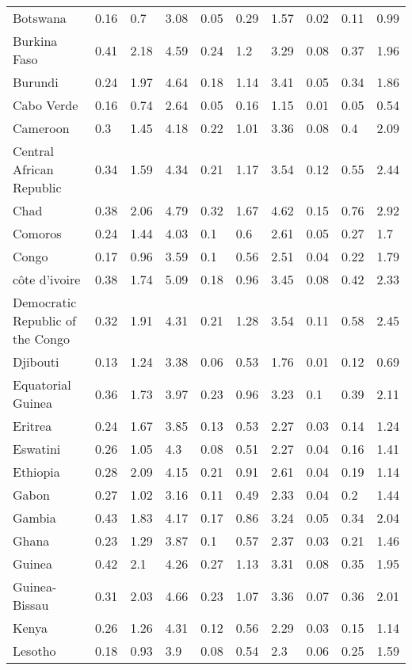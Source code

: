 \begin{longtable}[t]{llllllllll}
Botswana & 0.16 & 0.7 & 3.08 & 0.05 & 0.29 & 1.57 & 0.02 & 0.11 & 0.99\\
Burkina Faso & 0.41 & 2.18 & 4.59 & 0.24 & 1.2 & 3.29 & 0.08 & 0.37 & 1.96\\
Burundi & 0.24 & 1.97 & 4.64 & 0.18 & 1.14 & 3.41 & 0.05 & 0.34 & 1.86\\
Cabo Verde & 0.16 & 0.74 & 2.64 & 0.05 & 0.16 & 1.15 & 0.01 & 0.05 & 0.54\\
\addlinespace
Cameroon & 0.3 & 1.45 & 4.18 & 0.22 & 1.01 & 3.36 & 0.08 & 0.4 & 2.09\\
Central African Republic & 0.34 & 1.59 & 4.34 & 0.21 & 1.17 & 3.54 & 0.12 & 0.55 & 2.44\\
Chad & 0.38 & 2.06 & 4.79 & 0.32 & 1.67 & 4.62 & 0.15 & 0.76 & 2.92\\
Comoros & 0.24 & 1.44 & 4.03 & 0.1 & 0.6 & 2.61 & 0.05 & 0.27 & 1.7\\
Congo & 0.17 & 0.96 & 3.59 & 0.1 & 0.56 & 2.51 & 0.04 & 0.22 & 1.79\\
\addlinespace
côte d'ivoire & 0.38 & 1.74 & 5.09 & 0.18 & 0.96 & 3.45 & 0.08 & 0.42 & 2.33\\
Democratic Republic of the Congo & 0.32 & 1.91 & 4.31 & 0.21 & 1.28 & 3.54 & 0.11 & 0.58 & 2.45\\
Djibouti & 0.13 & 1.24 & 3.38 & 0.06 & 0.53 & 1.76 & 0.01 & 0.12 & 0.69\\
Equatorial Guinea & 0.36 & 1.73 & 3.97 & 0.23 & 0.96 & 3.23 & 0.1 & 0.39 & 2.11\\
Eritrea & 0.24 & 1.67 & 3.85 & 0.13 & 0.53 & 2.27 & 0.03 & 0.14 & 1.24\\
\addlinespace
Eswatini & 0.26 & 1.05 & 4.3 & 0.08 & 0.51 & 2.27 & 0.04 & 0.16 & 1.41\\
Ethiopia & 0.28 & 2.09 & 4.15 & 0.21 & 0.91 & 2.61 & 0.04 & 0.19 & 1.14\\
Gabon & 0.27 & 1.02 & 3.16 & 0.11 & 0.49 & 2.33 & 0.04 & 0.2 & 1.44\\
Gambia & 0.43 & 1.83 & 4.17 & 0.17 & 0.86 & 3.24 & 0.05 & 0.34 & 2.04\\
Ghana & 0.23 & 1.29 & 3.87 & 0.1 & 0.57 & 2.37 & 0.03 & 0.21 & 1.46\\
\addlinespace
Guinea & 0.42 & 2.1 & 4.26 & 0.27 & 1.13 & 3.31 & 0.08 & 0.35 & 1.95\\
Guinea-Bissau & 0.31 & 2.03 & 4.66 & 0.23 & 1.07 & 3.36 & 0.07 & 0.36 & 2.01\\
Kenya & 0.26 & 1.26 & 4.31 & 0.12 & 0.56 & 2.29 & 0.03 & 0.15 & 1.14\\
Lesotho & 0.18 & 0.93 & 3.9 & 0.08 & 0.54 & 2.3 & 0.06 & 0.25 & 1.59\\

\end{longtable}
